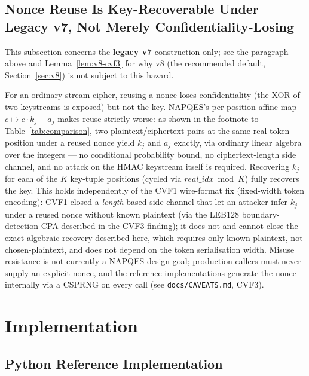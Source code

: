 \documentclass[11pt,a4paper]{article}
\begin{document}
\subsection{Nonce Reuse Is Key-Recoverable Under Legacy v7, Not Merely Confidentiality-Losing}
\label{sec:nonce-misuse}

This subsection concerns the \textbf{legacy v7} construction only; see the
paragraph above and Lemma~\ref{lem:v8-cvf3} for why v8 (the recommended
default, Section~\ref{sec:v8}) is not subject to this hazard.

For an ordinary stream cipher, reusing a nonce loses confidentiality (the
XOR of two keystreams is exposed) but not the key.  NAPQES's per-position
affine map $c \mapsto c\cdot k_j + a_j$ makes reuse strictly worse: as shown
in the footnote to Table~\ref{tab:comparison}, two plaintext/ciphertext
pairs at the same real-token position under a reused nonce yield $k_j$ and
$a_j$ exactly, via ordinary linear algebra over the integers — no
conditional probability bound, no ciphertext-length side channel, and no
attack on the HMAC keystream itself is required.  Recovering $k_j$ for each
of the $K$ key-tuple positions (cycled via $\mathit{real\_idx} \bmod K$)
fully recovers the key.  This holds independently of the CVF1 wire-format
fix (fixed-width token encoding): CVF1 closed a \emph{length}-based side
channel that let an attacker infer $k_j$ under a reused nonce without known
plaintext (via the LEB128 boundary-detection CPA described in the CVF3
finding); it does not and cannot close the exact algebraic recovery
described here, which requires only known-plaintext, not chosen-plaintext,
and does not depend on the token serialisation width. Misuse resistance is
not currently a NAPQES design goal; production callers must never supply
an explicit nonce, and the reference implementations generate the nonce
internally via a CSPRNG on every call (see \texttt{docs/CAVEATS.md}, CVF3).

\section{Implementation}
\label{sec:implementation}

\subsection{Python Reference Implementation}
\end{document}
